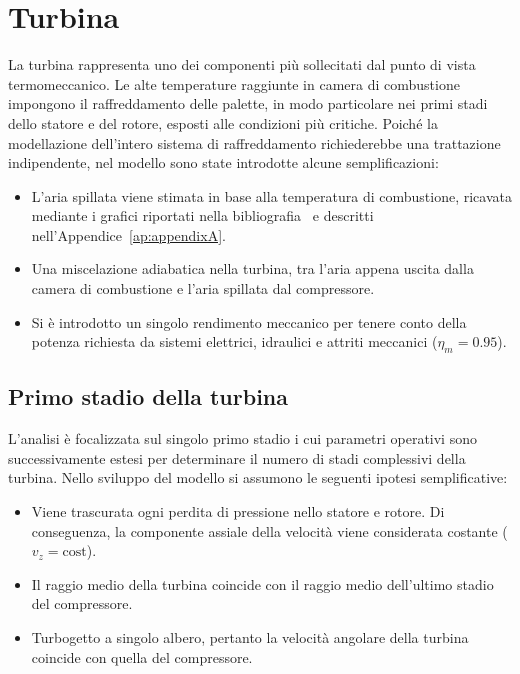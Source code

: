 \label{sec:turbina}
\hspace{2cm}
\section{Turbina}

La turbina rappresenta uno dei componenti più sollecitati dal punto di vista termomeccanico. Le alte temperature raggiunte in camera di combustione impongono il raffreddamento delle palette, in modo particolare nei primi stadi dello statore e del rotore, esposti alle condizioni più critiche.  Poiché la modellazione  dell'intero sistema di raffreddamento richiederebbe una trattazione indipendente, nel modello sono state introdotte alcune semplificazioni:
\begin{itemize}
    \item L'aria spillata viene stimata in base alla temperatura di combustione, ricavata mediante i grafici riportati nella bibliografia~\cite{slidesRobertoAndriani} e descritti nell'Appendice~\ref{ap:appendixA}.
    \item Una miscelazione adiabatica nella turbina, tra l'aria appena uscita dalla camera di combustione e l'aria  spillata dal compressore.
    \item Si è introdotto un singolo rendimento meccanico per tenere conto della potenza richiesta da sistemi elettrici, idraulici e attriti meccanici ($\eta_m = 0.95$). 
\end{itemize}

\subsection{Primo stadio della turbina}
L'analisi è focalizzata sul singolo primo stadio i cui parametri operativi sono successivamente estesi per determinare il numero di stadi complessivi della turbina. 
Nello sviluppo del modello si assumono le seguenti ipotesi semplificative:
\begin{itemize}
    \item Viene trascurata ogni perdita di pressione nello statore e rotore. Di conseguenza, la componente assiale della velocità viene considerata costante ($v_{z} = \text{cost}$).
    \item Il raggio medio della turbina coincide con il raggio medio dell'ultimo stadio del compressore.
    \item Turbogetto a singolo albero, pertanto la velocità angolare della turbina coincide con quella del compressore. 
\end{itemize}

